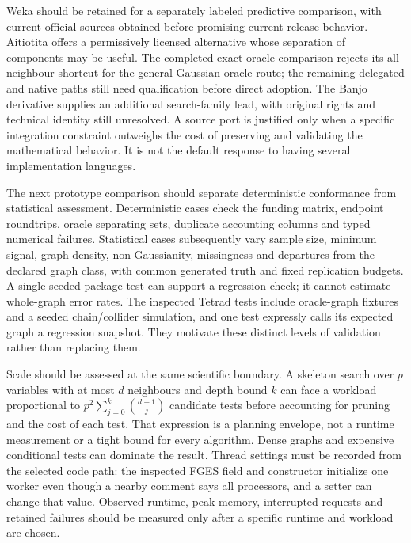 Weka should be retained for a separately labeled predictive comparison,
with current official sources obtained before promising current-release
behavior. Aitiotita offers a permissively licensed alternative whose
separation of components may be useful. The completed exact-oracle comparison
rejects its all-neighbour shortcut for the general Gaussian-oracle route;
the remaining delegated and native paths still need qualification before
direct adoption. The
Banjo derivative supplies an additional search-family lead, with
original rights and technical identity still unresolved. A source port
is justified only when a specific integration constraint outweighs the
cost of preserving and validating the mathematical behavior. It is not
the default response to having several implementation languages.
\citep{exec13_java_weka,exec13_java_aitiotita,exec13_java_banjo}

The next prototype comparison should separate deterministic conformance
from statistical assessment. Deterministic cases check the funding
matrix, endpoint roundtrips, oracle separating sets, duplicate
accounting columns and typed numerical failures. Statistical cases
subsequently vary sample size, minimum signal, graph density,
non-Gaussianity, missingness and departures from the declared graph
class, with common generated truth and fixed replication budgets. A
single seeded package test can support a regression check; it cannot
estimate whole-graph error rates. The inspected Tetrad tests include
oracle-graph fixtures and a seeded chain/collider simulation, and one
test expressly calls its expected graph a regression snapshot. They
motivate these distinct levels of validation rather than replacing them.
\citep{exec13_java_tetrad}

Scale should be assessed at the same scientific boundary. A skeleton
search over \(p\) variables with at most \(d\) neighbours and depth
bound \(k\) can face a workload proportional to
\(p^2\sum_{j=0}^{k}\binom{d-1}{j}\) candidate tests before accounting
for pruning and the cost of each test. That expression is a planning
envelope, not a runtime measurement or a tight bound for every
algorithm. Dense graphs and expensive conditional tests can dominate the
result. Thread settings must be recorded from the selected code path:
the inspected FGES field and constructor initialize one worker even
though a nearby comment says all processors, and a setter can change
that value. Observed runtime, peak memory, interrupted requests and
retained failures should be measured only after a specific runtime and
workload are chosen. \citep{exec13_java_tetrad}


